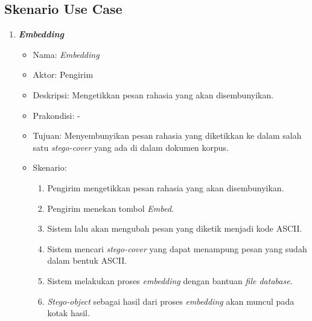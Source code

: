 \subsection{Skenario Use Case}

\begin{enumerate}
	\item \textbf{\textit{Embedding}}
	\begin{itemize}
		\item Nama: \textit{Embedding}
		\item Aktor: Pengirim
		\item Deskripsi: Mengetikkan pesan rahasia yang akan disembunyikan.
		\item Prakondisi: -
		\item Tujuan: Menyembunyikan pesan rahasia yang diketikkan ke dalam salah satu \textit{stego-cover} yang ada di dalam dokumen korpus.
		\item Skenario:
			\begin{enumerate}
				\item Pengirim mengetikkan pesan rahasia yang akan disembunyikan.
				\item Pengirim menekan tombol \textit{Embed}.
				\item Sistem lalu akan mengubah pesan yang diketik menjadi kode ASCII.
				\item Sistem mencari \textit{stego-cover} yang dapat menampung pesan yang sudah dalam bentuk ASCII.
				\item Sistem melakukan proses \textit{embedding} dengan bantuan \textit{file database}.
				\item \textit{Stego-object} sebagai hasil dari proses \textit{embedding} akan muncul pada kotak hasil.
			\end{enumerate}
	\end{itemize}
	

\end{enumerate}
